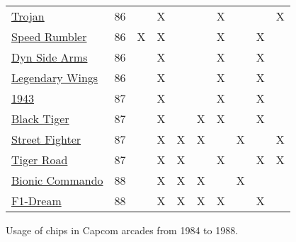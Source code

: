 \begin{figure}[H]
{\begin{tabular}{lccccccccc}
  \toprule    
\href{https://www.youtube.com/watch?v=L1FVWdlQNG8}{Trojan}
                & 86          &               &      X       &              &              &       X       &               &               &       X       \\
\href{https://www.youtube.com/watch?v=57lg9pFUgco}{Speed Rumbler}
                & 86          &       X       &      X       &              &              &       X       &               &       X       &               \\
\href{https://www.youtube.com/watch?v=0QyLx94PMio}{Dyn Side Arms}
                & 86          &               &      X       &              &              &       X       &               &       X       &               \\
\href{https://www.youtube.com/watch?v=0f4jWQyf-fs}{Legendary Wings}
                & 86          &               &      X       &              &              &       X       &               &       X       &               \\
  \toprule    
\href{https://www.youtube.com/watch?v=kntCwchJWfw}{1943}
                & 87          &               &      X       &              &              &       X       &               &       X       &               \\
\href{https://www.youtube.com/watch?v=ZzKStmMAiHM}{Black Tiger}
                & 87          &               &      X       &              &      X       &       X       &               &       X       &               \\
\href{https://www.youtube.com/watch?v=kVLCv-YgWco}{Street Fighter}
                & 87          &               &      X       &      X       &      X       &               &       X       &               &       X       \\
\href{https://www.youtube.com/watch?v=1ZtwOGN-ZeE}{Tiger Road}
                & 87          &               &      X       &      X       &              &       X       &               &       X       &       X       \\
  \toprule    
\href{https://www.youtube.com/watch?v=zG620nr7vko}{Bionic Commando}
                & 88          &               &      X       &      X       &      X       &               &       X       &               &               \\
\href{https://www.youtube.com/watch?v=zG620nr7vko}{F1-Dream}
                & 88          &               &      X       &      X       &      X       &       X       &               &       X       &               \\
  \toprule    
\end{tabular}%
}\caption*{Usage of chips in Capcom arcades from 1984 to 1988\cite{cps0chipslist}.}
\label{fig:capcom_pcbs}
\end{figure}


